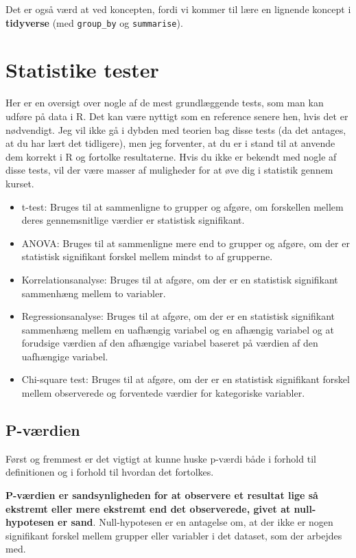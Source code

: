 \documentclass[
]{book}
\theoremstyle{definition}
\theoremstyle{definition}
\theoremstyle{definition}
\theoremstyle{definition}
\theoremstyle{remark}
\begin{document}
Det er også værd at ved koncepten, fordi vi kommer til lære en lignende koncept i \textbf{tidyverse} (med \texttt{group\_by} og \texttt{summarise}).

\section{Statistike tester}\label{statistike-tester}

Her er en oversigt over nogle af de mest grundlæggende tests, som man kan udføre på data i R. Det kan være nyttigt som en reference senere hen, hvis det er nødvendigt. Jeg vil ikke gå i dybden med teorien bag disse tests (da det antages, at du har lært det tidligere), men jeg forventer, at du er i stand til at anvende dem korrekt i R og fortolke resultaterne. Hvis du ikke er bekendt med nogle af disse tests, vil der være masser af muligheder for at øve dig i statistik gennem kurset.

\begin{itemize}
\item
  t-test: Bruges til at sammenligne to grupper og afgøre, om forskellen mellem deres gennemsnitlige værdier er statistisk signifikant.
\item
  ANOVA: Bruges til at sammenligne mere end to grupper og afgøre, om der er statistisk signifikant forskel mellem mindst to af grupperne.
\item
  Korrelationsanalyse: Bruges til at afgøre, om der er en statistisk signifikant sammenhæng mellem to variabler.
\item
  Regressionsanalyse: Bruges til at afgøre, om der er en statistisk signifikant sammenhæng mellem en uafhængig variabel og en afhængig variabel og at forudsige værdien af den afhængige variabel baseret på værdien af den uafhængige variabel.
\item
  Chi-square test: Bruges til at afgøre, om der er en statistisk signifikant forskel mellem observerede og forventede værdier for kategoriske variabler.
\end{itemize}

\subsection{P-værdien}\label{p-vuxe6rdien}

Først og fremmest er det vigtigt at kunne huske p-værdi både i forhold til definitionen og i forhold til hvordan det fortolkes.

\textbf{P-værdien er sandsynligheden for at observere et resultat lige så ekstremt eller mere ekstremt end det observerede, givet at null-hypotesen er sand}. Null-hypotesen er en antagelse om, at der ikke er nogen signifikant forskel mellem grupper eller variabler i det dataset, som der arbejdes med.
\end{document}
